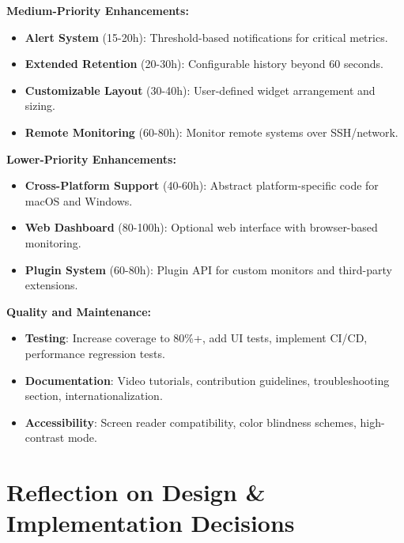 \documentclass[12pt,a4paper,oneside]{report}
\begin{document}
\textbf{Medium-Priority Enhancements:}
\begin{itemize}
    \item \textbf{Alert System} (15-20h): Threshold-based notifications for critical metrics.
    
    \item \textbf{Extended Retention} (20-30h): Configurable history beyond 60 seconds.
    
    \item \textbf{Customizable Layout} (30-40h): User-defined widget arrangement and sizing.
    
    \item \textbf{Remote Monitoring} (60-80h): Monitor remote systems over SSH/network.
\end{itemize}

\textbf{Lower-Priority Enhancements:}
\begin{itemize}
    \item \textbf{Cross-Platform Support} (40-60h): Abstract platform-specific code for macOS and Windows.
    
    \item \textbf{Web Dashboard} (80-100h): Optional web interface with browser-based monitoring.
    
    \item \textbf{Plugin System} (60-80h): Plugin API for custom monitors and third-party extensions.
\end{itemize}

\textbf{Quality and Maintenance:}
\begin{itemize}
    \item \textbf{Testing}: Increase coverage to 80\%+, add UI tests, implement CI/CD, performance regression tests.
    
    \item \textbf{Documentation}: Video tutorials, contribution guidelines, troubleshooting section, internationalization.
    
    \item \textbf{Accessibility}: Screen reader compatibility, color blindness schemes, high-contrast mode.
\end{itemize}

\section{Reflection on Design \& Implementation Decisions}
\label{sec:reflection}
\end{document}
